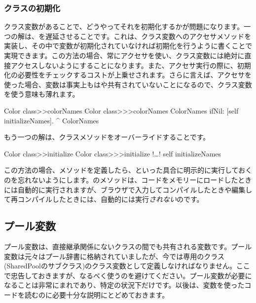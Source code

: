 \documentclass[a4paper,10pt,twoside]{book}
\begin{document}
\subsubsection{クラスの初期化}

クラス変数があることで、どうやってそれを初期化するかが問題になります。一つの解は、を遅延させることです。これは、クラス変数へのアクセサメソッドを実装し、その中で変数が初期化されていなければ初期化を行うように書くことで実現できます。この方法の場合、常にアクセサを使い、クラス変数には絶対に直接アクセスしないようにすることになります。また、アクセサ実行の際に、初期化の必要性をチェックするコストが上乗せされます。さらに言えば、アクセサを使った場合、変数は事実上もはや共有されていないことになるので、クラス変数を使う意味も薄れます。

\begin{method}[colorclasscolornames]{Color class>>colorNames}
Color class>>>colorNames	
	ColorNames ifNil: [self initializeNames].
	^ ColorNames
\end{method}	

もう一つの解は、クラスメソッドをオーバーライドすることです。

\begin{method}[colorclassinit]{Color class>>initialize}
Color class>>>initialize	
	!\ldots!
	self initializeNames
\end{method}	

\noindent
この方法の場合、メソッドを定義したら、といった具合に明示的に実行しておくのを忘れないようにします。のメソッドは、コードをメモリーにロードしたときには自動的に実行されますが、ブラウザで入力してコンパイルしたときや編集して再コンパイルしたときには、自動的には実行\emph{されない}のです。

\subsection{プール変数}
プール変数は、直接継承関係にないクラスの間でも共有される変数です。プール変数は元々はプール辞書に格納されていましたが、今では専用のクラス(SharedPoolのサブクラス)のクラス変数として定義しなければなりません。ここで忠告しておきますが、なるべく使うのを避けてください。プール変数が必要になることは非常にまれであり、特定の状況下だけです。以後は、変数を使ったコードを読むのに必要十分な説明にとどめておきます。
\end{document}
